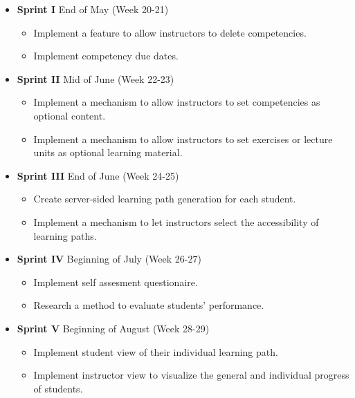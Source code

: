 \documentclass[a4paper,12pt,twoside]{article}
\begin{document}
\begin{itemize}
        \item \textbf{Sprint I} End of May (Week 20-21)
              \begin{itemize}
                      \item Implement a feature to allow instructors to delete competencies.
                      \item Implement competency due dates.
              \end{itemize}

        \item \textbf{Sprint II} Mid of June (Week 22-23)
              \begin{itemize}
                      \item Implement a mechanism to allow instructors to set competencies as optional content.
                      \item Implement a mechanism to allow instructors to set exercises or lecture units as optional learning material.
              \end{itemize}

        \item \textbf{Sprint III} End of June (Week 24-25)
              \begin{itemize}
                      \item Create server-sided learning path generation for each student.
                      \item Implement a mechanism to let instructors select the accessibility of learning paths.
              \end{itemize}

        \item \textbf{Sprint IV} Beginning of July (Week 26-27)
              \begin{itemize}
                      \item Implement self assesment questionaire.
                      \item Research a method to evaluate students' performance.
              \end{itemize}

        \item \textbf{Sprint V} Beginning of August (Week 28-29)
              \begin{itemize}
                      \item Implement student view of their individual learning path.
                      \item Implement instructor view to visualize the general and individual progress of students.
              \end{itemize}


\end{itemize}
\end{document}
